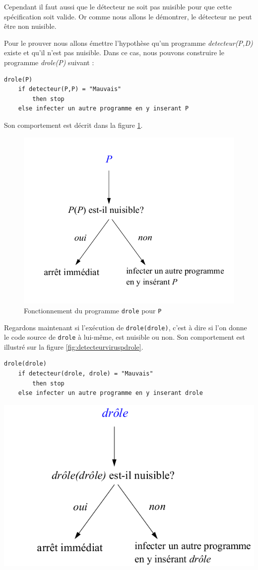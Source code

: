 Cependant il faut aussi que le détecteur ne soit pas nuisible pour que cette spécification soit valide. Or comme nous allons le démontrer, le détecteur ne peut être non nuisible.

Pour le prouver nous allons émettre l'hypothèse qu'un programme \textit{detecteur(P,D)} existe et qu'il n'est pas nuisible.  Dans ce cas, nous pouvons construire le programme \textit{drole(P)} suivant :

\label{lst:detecteur_de_virus}
\begin{lstlisting}
drole(P)
    if detecteur(P,P) = "Mauvais"
        then stop
    else infecter un autre programme en y inserant P
\end{lstlisting}
Son comportement est décrit dans la figure \ref{fig:detecteurviruspp}.
\begin{figure}[h]
	\centering
	\includegraphics[width=0.6\linewidth]{Images/detecteur_virus_p(p)}
	\caption{Fonctionnement du programme \lstinline|drole| pour \lstinline|P|}
	\label{fig:detecteurviruspp}
\end{figure}

Regardons maintenant si l'exécution de \lstinline|drole(drole)|, c'est à dire si l'on donne le code source de \lstinline|drole| à lui-même, est nuisible ou non. Son comportement est illustré sur la figure \ref{fig:detecteurviruspdrole}.
\begin{lstlisting}
drole(drole)
    if detecteur(drole, drole) = "Mauvais"
	    then stop
    else infecter un autre programme en y inserant drole
\end{lstlisting}

\begin{center}
\includegraphics[scale=0.5]{Images/drole_de_drole.png}
\end{center}

